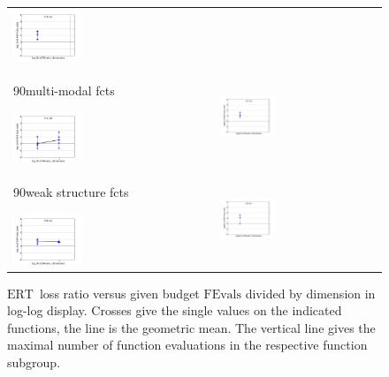 \documentclass{article}
\newcommand{\ERT}{\ensuremath{\mathrm{ERT}}}
\newcommand{\FEvals}{\ensuremath{\mathrm{FEvals}}}
\newcommand{\rot}[2][2.5]{
  \hspace*{-3.5\baselineskip}%
  \begin{rotate}{90}\hspace{#1em}#2
  \end{rotate}}
\begin{document}
\begin{figure}[htbp!]
\begin{tabular}{@{}ll@{}}
\includegraphics[width=0.35\textwidth,trim=9mm 5mm 18mm 12mm, clip]{pplogloss_20D_hcond}\\[-2ex]
\rot[1.6]{multi-modal fcts}
\includegraphics[width=0.35\textwidth,trim=9mm 5mm 18mm 12mm, clip]{pplogloss_05D_multi} &
\includegraphics[width=0.35\textwidth,trim=9mm 5mm 18mm 12mm, clip]{pplogloss_20D_multi}\\[-2ex]
\rot[1.0]{weak structure fcts}
\includegraphics[width=0.35\textwidth,trim=9mm 0mm 18mm 12mm, clip]{pplogloss_05D_mult2} &
\includegraphics[width=0.35\textwidth,trim=9mm 0mm 18mm 12mm, clip]{pplogloss_20D_mult2}
\vspace*{-1ex}
\end{tabular}
\caption{\label{fig:ERTloglossb\algfolder}\ERT\ loss ratio versus given budget
$\FEvals$ divided by dimension in log-log display. Crosses give
the single values on the indicated functions, the line is the geometric mean.
The vertical line gives the maximal number of function evaluations in the
respective function subgroup.}
\end{figure}
\end{document}

